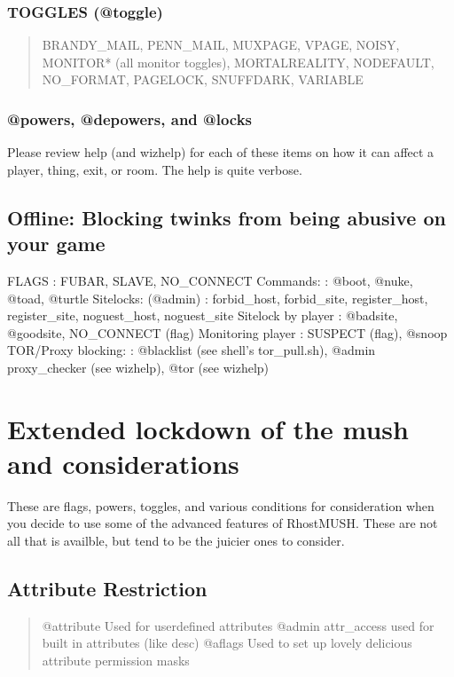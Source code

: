 \documentclass[letterpaper,10pt,english]{sphinxmanual}
\begin{document}
\subsubsection{TOGGLES (@toggle)}
\label{\detokenize{security:toggles-toggle}}\begin{quote}

\sphinxAtStartPar
BRANDY\_MAIL, PENN\_MAIL, MUXPAGE, VPAGE, NOISY,
MONITOR* (all monitor toggles), MORTALREALITY,
NODEFAULT, NO\_FORMAT, PAGELOCK, SNUFFDARK, VARIABLE
\end{quote}


\subsubsection{@powers, @depowers, and @locks}
\label{\detokenize{security:powers-depowers-and-locks}}
\sphinxAtStartPar
Please review help (and wizhelp) for each of these items on how it can affect
a player, thing, exit, or room.  The help is quite verbose.


\subsection{Offline: Blocking twinks from being abusive on your game}
\label{\detokenize{security:offline-blocking-twinks-from-being-abusive-on-your-game}}
\sphinxAtStartPar
FLAGS                   : FUBAR, SLAVE, NO\_CONNECT
Commands:               : @boot, @nuke, @toad, @turtle
Sitelocks: (@admin)     : forbid\_host, forbid\_site, register\_host, register\_site, noguest\_host, noguest\_site
Sitelock by player      : @badsite, @goodsite, NO\_CONNECT (flag)
Monitoring player       : SUSPECT (flag), @snoop
TOR/Proxy blocking:     : @blacklist (see shell’s tor\_pull.sh), @admin proxy\_checker (see wizhelp), @tor (see wizhelp)


\section{Extended lockdown of the mush and considerations}
\label{\detokenize{security:extended-lockdown-of-the-mush-and-considerations}}
\sphinxAtStartPar
These are flags, powers, toggles, and various conditions for consideration
when you decide to use some of the advanced features of RhostMUSH.
These are not all that is availble, but tend to be the juicier ones to consider.


\subsection{Attribute Restriction}
\label{\detokenize{security:attribute-restriction}}\begin{quote}

\sphinxAtStartPar
@attribute \textendash{} Used for user\sphinxhyphen{}defined attributes
@admin attr\_access \textendash{} used for built in attributes (like desc)
@aflags \textendash{} Used to set up lovely delicious attribute permission masks
\end{quote}
\end{document}
